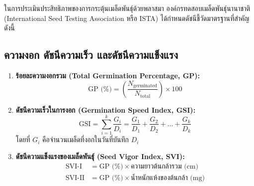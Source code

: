 ในการประเมินประสิทธิภาพของการกระตุ้นเมล็ดพันธุ์ด้วยพลาสมา องค์กรทดสอบเมล็ดพันธุ์นานาชาติ (International Seed Testing Association หรือ ISTA) ได้กำหนดดัชนีชี้วัดมาตรฐานที่สำคัญ ดังนี้

\subsection{ความงอก ดัชนีความเร็ว และดัชนีความแข็งแรง}

\begin{enumerate}
    \item \textbf{ร้อยละความงอกรวม (Total Germination Percentage, GP):}
    \begin{equation}
        \text{GP (\%)} = \left( \frac{N_{\text{germinated}}}{N_{\text{total}}} \right) \times 100
        \label{eq:gp}
    \end{equation}
    
    \item \textbf{ดัชนีความเร็วในการงอก (Germination Speed Index, GSI):}
    \begin{equation}
        \text{GSI} = \sum_{i=1}^k \frac{G_i}{D_i} = \frac{G_1}{D_1} + \frac{G_2}{D_2} + \dots + \frac{G_k}{D_k}
        \label{eq:gsi}
    \end{equation}
    โดยที่ $G_i$ คือจำนวนเมล็ดที่งอกในวันที่บันทึก $D_i$
    
    \item \textbf{ดัชนีความแข็งแรงของเมล็ดพันธุ์ (Seed Vigor Index, SVI):}
    \begin{align}
        \text{SVI-I} &= \text{GP (\%)} \times \text{ความยาวต้นกล้ารวม (cm)} \label{eq:svi_1} \\
        \text{SVI-II} &= \text{GP (\%)} \times \text{น้ำหนักแห้งของต้นกล้า (mg)} \label{eq:svi_2}
    \end{align}
\end{enumerate}

